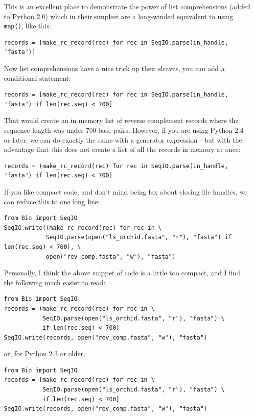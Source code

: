 \documentclass{report}
\begin{document}
This is an excellent place to demonstrate the power of list comprehensions (added to Python 2.0) which in their simplest are a long-winded equivalent to using \verb|map()|, like this:

\begin{verbatim}
records = [make_rc_record(rec) for rec in SeqIO.parse(in_handle, "fasta")]
\end{verbatim}

\noindent Now list comprehensions have a nice trick up their sleaves, you can add a conditional statement:

\begin{verbatim}
records = [make_rc_record(rec) for rec in SeqIO.parse(in_handle, "fasta") if len(rec.seq) < 700]
\end{verbatim}

That would create an in memory list of reverse complement records where the sequence length was under 700 base pairs. However, if you are using Python 2.4 or later, we can do exactly the same with a generator expression - but with the advantage that this does not create a list of all the records in memory at once:

\begin{verbatim}
records = (make_rc_record(rec) for rec in SeqIO.parse(in_handle, "fasta") if len(rec.seq) < 700)
\end{verbatim}

If you like compact code, and don't mind being lax about closing file handles, we can reduce this to one long line:

\begin{verbatim}
from Bio import SeqIO
SeqIO.write((make_rc_record(rec) for rec in \
            SeqIO.parse(open("ls_orchid.fasta", "r"), "fasta") if len(rec.seq) < 700), \
            open("rev_comp.fasta", "w"), "fasta")
\end{verbatim}

Personally, I think the above snippet of code is a little too compact, and I find the following much easier to read:

\begin{verbatim}
from Bio import SeqIO
records = (make_rc_record(rec) for rec in \
           SeqIO.parse(open("ls_orchid.fasta", "r"), "fasta") \
           if len(rec.seq) < 700)
SeqIO.write(records, open("rev_comp.fasta", "w"), "fasta")
\end{verbatim}

\noindent or, for Python 2.3 or older,

\begin{verbatim}
from Bio import SeqIO
records = [make_rc_record(rec) for rec in \
           SeqIO.parse(open("ls_orchid.fasta", "r"), "fasta") \
           if len(rec.seq) < 700]
SeqIO.write(records, open("rev_comp.fasta", "w"), "fasta")
\end{verbatim}
\end{document}
